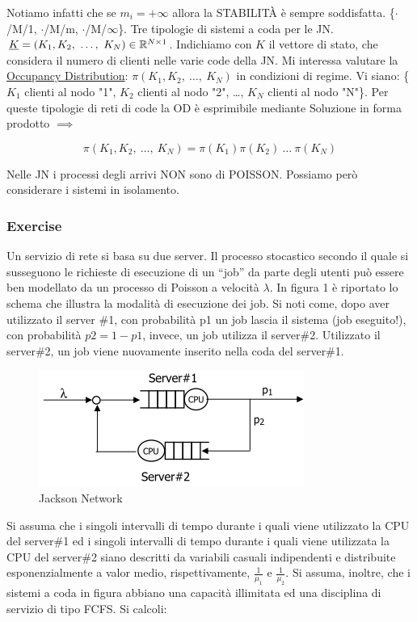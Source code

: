 Notiamo infatti che se $m_i=+\infty$ allora la STABILIT\`A è sempre soddisfatta. \{$\mathord{\cdot}$/M/1, $\mathord{\cdot}$/M/m, $\mathord{\cdot}$/M/$\infty$\}. Tre tipologie di sistemi a coda per le JN. $\underline{K}=(K_1,K_2,\ \dots,\ K_N)\in\mathbb{R}^{N\times 1}$. Indichiamo con $K$ il vettore di stato, che considera il numero di clienti nelle varie code della JN. Mi interessa valutare la \underline{Occupancy Distribution}: $\pi(K_1,K_2,\ \dots,\ K_N)$ in condizioni di regime. Vi siano: \{$K_1$ clienti al nodo "1", $K_2$ clienti al nodo "2", \dots, $K_N$ clienti al nodo "N"\}. Per queste tipologie di reti di code la OD è esprimibile mediante Soluzione in forma prodotto $\implies$

\[
	\pi(K_1,K_2,\ \dots,\ K_N) = \pi(K_1)\pi(K_2)\ \dots\ \pi(K_N)
\]

Nelle JN i processi degli arrivi NON sono di POISSON. Possiamo però considerare i sistemi in isolamento.

\subsubsection{Exercise}

Un servizio di rete si basa su due server. Il processo stocastico secondo il 
quale si susseguono le richieste di esecuzione di un “job” da parte degli utenti 
può essere ben modellato da un processo di Poisson a velocità $\lambda$. In figura 1 è 
riportato lo schema che illustra la modalità di esecuzione dei job. Si noti 
come, dopo aver utilizzato il server \#1, con probabilità p1 un job lascia il 
sistema (job eseguito!), con probabilità $p2= 1-p1$, invece, un job utilizza il 
server\#2. Utilizzato il server\#2, un job viene nuovamente inserito nella coda 
del server\#1.

\begin{center}
\begin{figure}[H]
\centering
\includegraphics[scale=1]{figures/ex/jksnet.png}
\caption{Jackson Network}
\end{figure}
\end{center}

Si assuma che i singoli intervalli di tempo durante i quali viene utilizzato la 
CPU del server\#1 ed i singoli intervalli di tempo durante i quali viene 
utilizzata la CPU del server\#2 siano descritti da variabili casuali indipendenti 
e distribuite esponenzialmente a valor medio, rispettivamente, $\frac{1}{\mu_1}$ e $\frac{1}{\mu_2}$.  
Si assuma, inoltre, che i sistemi a coda in figura abbiano una capacità 
illimitata ed una disciplina di servizio di tipo FCFS.  
Si calcoli: 

